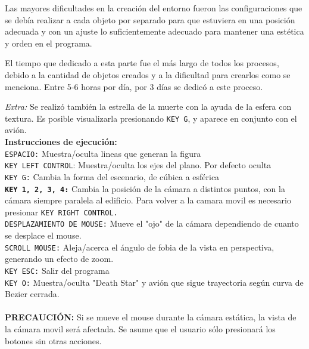 \documentclass[letterpaper,11pt]{article}
\begin{document}
Las mayores dificultades en la creación del entorno fueron las configuraciones que se debía realizar a cada objeto por separado para que estuviera en una posición adecuada y con un ajuste lo suficientemente adecuado para mantener una estética y orden en el programa.

El tiempo que dedicado a esta parte fue el más largo de todos los procesos, debido a la cantidad de objetos creados y a la dificultad para crearlos como se menciona. Entre 5-6 horas por día, por 3 días se dedicó a este proceso.

\textit{Extra:} Se realizó también la estrella de la muerte con la ayuda de la esfera con textura. Es posible visualizarla presionando \texttt{KEY G}, y aparece en conjunto con el avión.\\




{\centering \textbf{{\Large Instrucciones de ejecución:}}}
\\
\texttt{ESPACIO:} Muestra/oculta lineas que generan la figura\\
\texttt{KEY LEFT CONTROL}: Muestra/oculta los ejes del plano. Por defecto oculta\\
\texttt{KEY G:} Cambia la forma del escenario, de cúbica a esférica \\
\textbf{\texttt{KEY 1, 2, 3, 4:}} Cambia la posición de la cámara a distintos puntos, con la cámara siempre paralela al edificio. Para volver a la camara movil es necesario presionar \texttt{KEY RIGHT CONTROL.}\\
\texttt{DESPLAZAMIENTO DE MOUSE:} Mueve el "ojo" de la cámara dependiendo de cuanto se desplace el mouse.\\
\texttt{SCROLL MOUSE:} Aleja/acerca el ángulo de fobia de la vista en perspectiva, generando un efecto de zoom.\\
\texttt{KEY ESC:} Salir del programa\\
\texttt{KEY O:} Muestra/oculta "Death Star" y avión que sigue trayectoria según curva de Bezier cerrada.\\
\\
\textbf{PRECAUCIÓN:} Si se mueve el mouse durante la cámara estática, la vista de la cámara movil será afectada. Se asume que el usuario sólo presionará los botones sin otras acciones.
\end{document}
